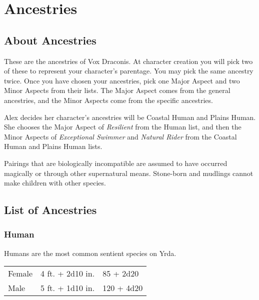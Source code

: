 \chapter{Ancestries}

\begin{multicols}{2}

\section{About Ancestries}

These are the ancestries of Vox Draconis. At character creation you will 
pick two of these to represent your character's parentage. You may pick 
the same ancestry twice. Once you have chosen your ancestries, pick one 
Major Aspect and two Minor Aspects from their lists. The Major Aspect 
comes from the general ancestries, and the Minor Aspects come from the 
specific ancestries.

\begin{displayquote}
Alex decides her character's ancestries will be Coastal Human and Plains 
Human. She chooses the Major Aspect of \textit{Resilient} from the Human
list, and then the Minor Aspects of \textit{Exceptional Swimmer} and 
\textit{Natural Rider} from the Coastal Human and Plains Human lists.
\end{displayquote}

Pairings that are biologically incompatible are assumed to have occurred 
magically or through other supernatural means. Stone-born and mudlings 
cannot make children with other species.

\section{List of Ancestries}

\subsection{Human}

Humans are the most common sentient species on Yrda.

\begin{center}
{
\begin{xtabular}{|l|l|l|}
Female & 4 ft. + 2d10 in. & 85 + 2d20 \\
Male & 5 ft. + 1d10 in. & 120 + 4d20 \\
\hline
\end{xtabular}
}
\end{center}


\end{multicols}
